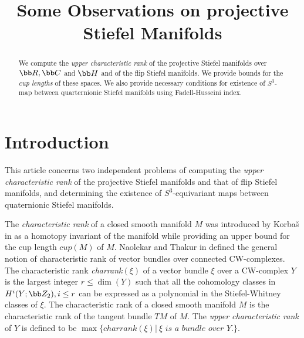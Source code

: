 
\title{Some Observations on projective Stiefel Manifolds}
\begin{abstract}
    We compute the \textit{upper characteristic rank} of the projective Stiefel manifolds over $\bb R, \bb C$ and $\bb H$ and of the flip Stiefel manifolds. We provide bounds for the \textit{cup lengths} of these spaces. We also provide necessary conditions for existence of $S^3$-map between quarternionic Stiefel manifolds using Fadell-Husseini index.
\end{abstract}
\maketitle

\section*{Introduction}
This article concerns two independent problems of computing the \textit{upper characteristic rank }of the projective Stiefel manifolds and that of flip Stiefel manifolds, and determining the existence of $S^3$-equivariant maps between quaternionic Stiefel manifolds.

The \textit{characteristic rank} of a closed smooth manifold $M$ was introduced by Korba\v{s} in \cite{Korbaš2010} as a homotopy invariant of the manifold while providing an upper bound for the cup length $cup(M)$ of $M$. Naolekar and Thakur in \cite{NT2014} defined the general notion of characteristic rank of vector bundles over connected CW-complexes. The characteristic rank \textit{charrank}$(\xi)$ of a vector bundle $\xi$ over a CW-complex $Y$ is the largest integer $r\leq \dim (Y)$ such that all the cohomology classes in $H^i(Y; \bb Z_2), i\leq r$ can be expressed as a polynomial in the Stiefel-Whitney classes of $\xi$. The characteristic rank of a closed smooth manifold $M$ is the characteristic rank of the tangent bundle $TM$ of $M$. The \textit{upper characteristic rank} of $Y$ is defined to be $\max\{charrank(\xi) |~\textit{$\xi$ is a bundle over $Y$.}\}$.

